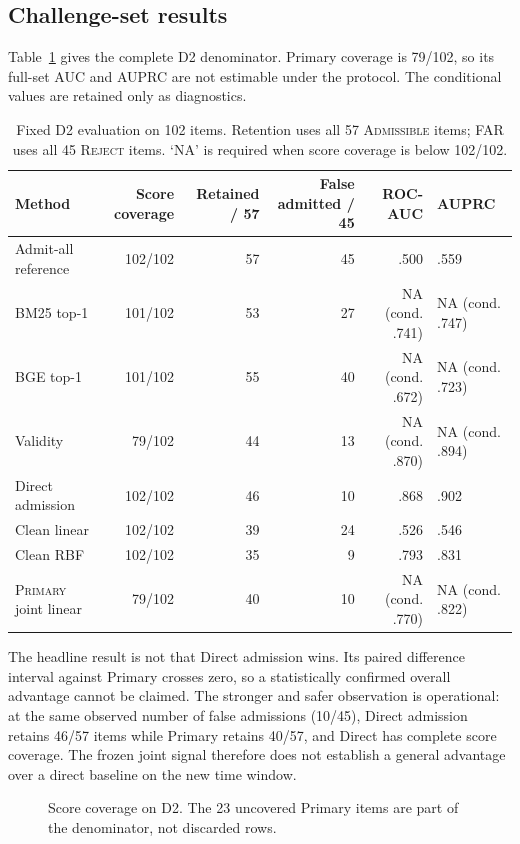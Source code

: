 \documentclass[5p,times]{elsarticle}
\newcommand{\admissible}{\mbox{\textsc{Admissible}}}
\newcommand{\reject}{\mbox{\textsc{Reject}}}
\newcommand{\primary}{\mbox{\textsc{Primary}}}
\begin{document}
\subsection{Challenge-set results}

Table~\ref{tab:main-results} gives the complete D2 denominator. Primary coverage is 79/102, so its full-set AUC and AUPRC are not estimable under the protocol. The conditional values are retained only as diagnostics.

\begin{table}[t]
\centering
\caption{Fixed D2 evaluation on 102 items. Retention uses all 57 \admissible{} items; FAR uses all 45 \reject{} items. `NA' is required when score coverage is below 102/102.}
\label{tab:main-results}
\small
\begin{tabular}{@{}lrrrrl@{}}
\toprule
Method & Score coverage & Retained / 57 & False admitted / 45 & ROC-AUC & AUPRC \\
\midrule
Admit-all reference & 102/102 & 57 & 45 & .500 & .559 \\
BM25 top-1 & 101/102 & 53 & 27 & NA (cond. .741) & NA (cond. .747) \\
BGE top-1 & 101/102 & 55 & 40 & NA (cond. .672) & NA (cond. .723) \\
Validity & 79/102 & 44 & 13 & NA (cond. .870) & NA (cond. .894) \\
Direct admission & 102/102 & 46 & 10 & .868 & .902 \\
Clean linear & 102/102 & 39 & 24 & .526 & .546 \\
Clean RBF & 102/102 & 35 & 9 & .793 & .831 \\
\primary{} joint linear & 79/102 & 40 & 10 & NA (cond. .770) & NA (cond. .822) \\
\bottomrule
\end{tabular}
\end{table}

The headline result is not that Direct admission wins. Its paired difference interval against Primary crosses zero, so a statistically confirmed overall advantage cannot be claimed. The stronger and safer observation is operational: at the same observed number of false admissions (10/45), Direct admission retains 46/57 items while Primary retains 40/57, and Direct has complete score coverage. The frozen joint signal therefore does not establish a general advantage over a direct baseline on the new time window.

\begin{figure}[t]
  \centering
  
  \caption{Score coverage on D2. The 23 uncovered Primary items are part of the denominator, not discarded rows.}
  \label{fig:coverage}
\end{figure}
\end{document}
